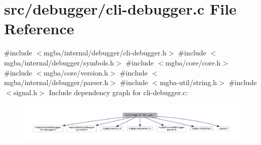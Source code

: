 \hypertarget{debugger_2cli-debugger_8c}{}\section{src/debugger/cli-\/debugger.c File Reference}
\label{debugger_2cli-debugger_8c}
{\ttfamily \#include $<$mgba/internal/debugger/cli-\/debugger.\+h$>$}\newline
{\ttfamily \#include $<$mgba/internal/debugger/symbols.\+h$>$}\newline
{\ttfamily \#include $<$mgba/core/core.\+h$>$}\newline
{\ttfamily \#include $<$mgba/core/version.\+h$>$}\newline
{\ttfamily \#include $<$mgba/internal/debugger/parser.\+h$>$}\newline
{\ttfamily \#include $<$mgba-\/util/string.\+h$>$}\newline
{\ttfamily \#include $<$signal.\+h$>$}\newline
Include dependency graph for cli-\/debugger.c\+:
\nopagebreak
\begin{figure}[H]
\begin{center}
\leavevmode
\includegraphics[width=350pt]{debugger_2cli-debugger_8c__incl}
\end{center}
\end{figure}
